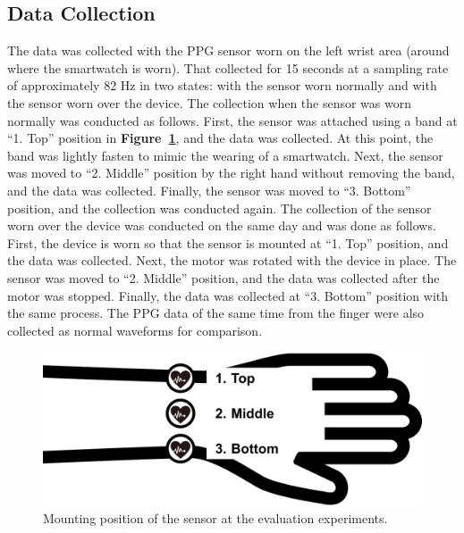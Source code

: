 \documentclass[sigconf]{acmart}
\newcommand\figref[1]{\textbf{Figure~\ref{fig:#1}}}
\begin{document}
\subsection{Data Collection}
The data was collected with the PPG sensor worn on the left wrist area (around where the smartwatch is worn). That collected for 15 seconds at a sampling rate of approximately 82 Hz in two states: with the sensor worn normally and with the sensor worn over the device. The collection when the sensor was worn normally was conducted as follows. First, the sensor was attached using a band at ``1. Top'' position in \figref{position}, and the data was collected. At this point, the band was lightly fasten to mimic the wearing of a smartwatch. Next, the sensor was moved to ``2. Middle'' position by the right hand without removing the band, and the data was collected. Finally, the sensor was moved to ``3. Bottom'' position, and the collection was conducted again. The collection of the sensor worn over the device was conducted on the same day and was done as follows. First, the device is worn so that the sensor is mounted at ``1. Top'' position, and the data was collected. Next, the motor was rotated with the device in place. The sensor was moved to ``2. Middle'' position, and the data was collected after the motor was stopped. Finally, the data was collected at ``3. Bottom'' position with the same process. The PPG data of the same time from the finger were also collected as normal waveforms for comparison.

\begin{figure}[!t]
  \centering
  \includegraphics[width=0.8\linewidth]{figures/position.eps}
  \caption{Mounting position of the sensor at the evaluation experiments.}
  \label{fig:position}
\end{figure}
\end{document}
